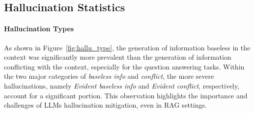 \documentclass[11pt]{article}
\begin{document}



\subsection{Hallucination Statistics}




\paragraph{Hallucination Types} As shown in Figure~\ref{fig:hallu_type}, the generation of information baseless in the context was significantly more prevalent than the generation of information conflicting with the context, especially for the question answering tasks. Within the two major categories of \textit{baseless info} and \textit{conflict}, the more severe hallucinations, namely \textit{Evident baseless info} and \textit{Evident conflict}, respectively, account for a significant portion. This observation highlights the importance and challenges of LLMs hallucination mitigation, even in RAG settings.

\end{document}
